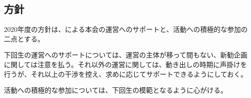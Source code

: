 \subsection*{\newGradeIfKouki{}\thirdGrade{}方針}




2020年度の\newGradeIfKouki{}\thirdGrade{}方針は、\newGradeIfKouki{}\secondGrade{}による本会の運営へのサポートと、活動への積極的な参加の二点とする。

下回生の運営へのサポートについては、運営の主体が移って間もない、新勧企画に関しては注意を払う。それ以外の運営に関しては、動き出しの時期に声掛けを行うが、それ以上の干渉を控え、求めに応じてサポートできるようにしておく。

活動への積極的な参加については、下回生の模範となるように心がける。